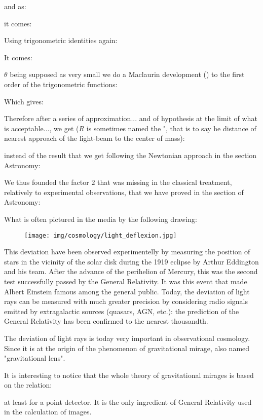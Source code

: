 	and as:
	
	it comes:
	
	Using trigonometric identities again:
	
	It comes:
	
	$\theta$ being supposed as very small we do a Maclaurin development () to the first order of the trigonometric functions:
	
	Which gives:
	
	Therefore after a series of approximation... and of hypothesis at the limit of what is acceptable..., we get ($R$ is sometimes named the ", that is to say he distance of nearest approach of the light-beam to the center of mass):
	
	instead of the result that we get following the Newtonian approach in the section Astronomy:
	
	We thus founded the factor $2$ that was missing in the classical treatment, relatively to experimental observations, that we have proved in the section of Astronomy:
	
	What is often pictured in the media by the following drawing:
	\begin{figure}[H]
		\centering
		\texttt{[image: img/cosmology/light\_deflexion.jpg]}	
	\end{figure}
	This deviation have been observed experimentelly by measuring the position of stars in the vicinity of the solar disk during the 1919 eclipse by Arthur Eddington and his team. After the advance of the perihelion of Mercury, this was the second test successfully passed by the General Relativity. It was this event that made Albert Einstein famous among the general public. Today, the deviation of light rays can be measured with much greater precision by considering radio signals emitted by extragalactic sources (quasars, AGN, etc.): the prediction of the General Relativity has been confirmed to the nearest thousandth.

	The deviation of light rays is today very important in observational cosmology. Since it is at the origin of the phenomenon of gravitational mirage, also named "gravitational lens".

	It is interesting to notice that the whole theory of gravitational mirages is based on the relation:
	
	at least for a point detector. It is the only ingredient of General Relativity used in the calculation of images.
	
